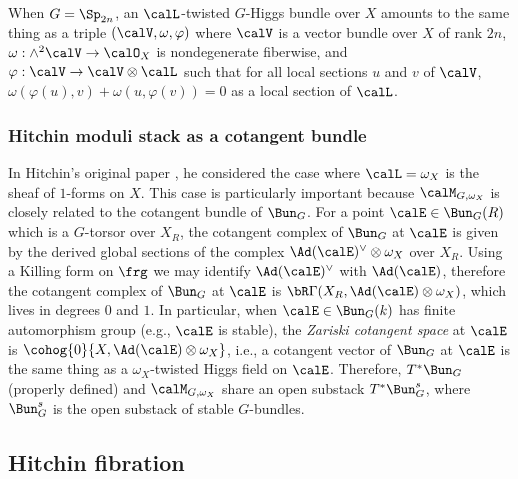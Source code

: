 When $G=\Sp_{2n}$, an $\calL$-twisted $G$-Higgs bundle over $X$ amounts to the same thing as a triple $(\calV,\omega,\varphi)$ where $\calV$ is a vector bundle over $X$ of rank $2n$, $\omega:\wedge^{2}\calV\to\calO_{X}$ is nondegenerate fiberwise,  and $\varphi: \calV\to\calV\otimes\calL$ such that for all local sections $u$ and $v$ of $\calV$,  $\omega(\varphi(u),v)+\omega(u,\varphi(v))=0$ as a local section of $\calL$. 



\subsubsection{Hitchin moduli stack as a cotangent bundle}
In Hitchin's original paper \cite{Hi}, he considered the case where $\calL=\omega_{X}$ is the sheaf of $1$-forms on $X$.   This case is particularly important because $\calM_{G,\omega_{X}}$ is closely related to the cotangent bundle of $\Bun_{G}$. For a point $\calE\in\Bun_{G}(R)$ which is a $G$-torsor over $X_{R}$, the cotangent complex of $\Bun_{G}$ at $\calE$ is given by the derived global sections of the complex $\Ad(\calE)^{\vee}\otimes\omega_{X}$ over $X_{R}$. Using a Killing form on $\frg$ we may identify $\Ad(\calE)^{\vee}$ with $\Ad(\calE)$, therefore the cotangent complex of $\Bun_{G}$ at $\calE$ is $\bR\Gamma(X_{R}, \Ad(\calE)\otimes\omega_{X})$, which lives in degrees $0$ and $1$. In particular, when $\calE\in \Bun_{G}(k)$ has finite automorphism group (e.g., $\calE$ is stable), the {\em Zariski cotangent space} at $\calE$ is $\cohog{0}{X,\Ad(\calE)\otimes\omega_{X}}$, i.e., a cotangent vector of $\Bun_{G}$ at $\calE$ is the same thing as a $\omega_{X}$-twisted Higgs field on $\calE$. Therefore, $T^{*}\Bun_{G}$ (properly defined) and $\calM_{G,\omega_{X}}$ share an open substack $T^{*}\Bun^{s}_{G}$, where $\Bun^{s}_{G}$ is the open substack of stable $G$-bundles.

\subsection{Hitchin fibration}

